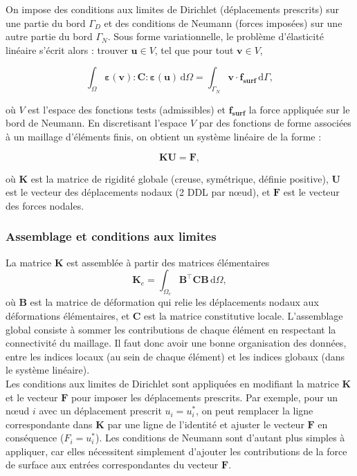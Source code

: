 \documentclass[a4paper,11pt]{article}
\begin{document}
On impose des conditions aux limites de Dirichlet (déplacements prescrits) sur une partie du bord $\Gamma_D$ et des conditions de Neumann (forces imposées) sur une autre partie du bord $\Gamma_N$. Sous forme variationnelle, le problème d'élasticité linéaire s'écrit alors : trouver $\mathbf{u} \in V$, tel que pour tout $\mathbf{v} \in V$,

\begin{equation}
\int_\Omega \boldsymbol{\varepsilon}(\mathbf{v}) : \mathbf{C} : \boldsymbol{\varepsilon}(\mathbf{u})\,\mathrm{d}\Omega = \int_{\Gamma_N} \mathbf{v} \cdot \mathbf{f_{surf}}\,\mathrm{d}\Gamma,
\end{equation}

où $V$ est l'espace des fonctions tests (admissibles) et $\mathbf{f_{surf}}$ la force appliquée sur le bord de Neumann. En discretisant l'espace $V$ par des fonctions de forme associées à un maillage d'éléments finis, on obtient un système linéaire de la forme :

\begin{equation}
\mathbf{K}\mathbf{U} = \mathbf{F},
\end{equation}

où $\mathbf{K}$ est la matrice de rigidité globale (creuse, symétrique, définie positive), $\mathbf{U}$ est le vecteur des déplacements nodaux (2 DDL par nœud), et $\mathbf{F}$ est le vecteur des forces nodales. 

\subsubsection*{Assemblage et conditions aux limites}
La matrice $\mathbf{K}$ est assemblée à partir des matrices élémentaires
\[
\mathbf{K}_e = \int_{\Omega_e} \mathbf{B}^\top \mathbf{C}\mathbf{B}\,\mathrm{d}\Omega,
\]
où $\mathbf{B}$ est la matrice de déformation qui relie les déplacements nodaux aux déformations élémentaires, et $\mathbf{C}$ est la matrice constitutive locale. L'assemblage global consiste à sommer les contributions de chaque élément en respectant la connectivité du maillage. Il faut donc avoir une bonne organisation des données, entre les indices locaux (au sein de chaque élément) et les indices globaux (dans le système linéaire). \\

Les conditions aux limites de Dirichlet sont appliquées en modifiant la matrice $\mathbf{K}$ et le vecteur $\mathbf{F}$ pour imposer les déplacements prescrits. Par exemple, pour un nœud $i$ avec un déplacement prescrit $u_i = u_i^*$, on peut remplacer la ligne correspondante dans $\mathbf{K}$ par une ligne de l'identité et ajuster le vecteur $\mathbf{F}$ en conséquence ($F_i = u_i^*$). Les conditions de Neumann sont d'autant plus simples à appliquer, car elles nécessitent simplement d'ajouter les contributions de la force de surface aux entrées correspondantes du vecteur $\mathbf{F}$.
\end{document}
